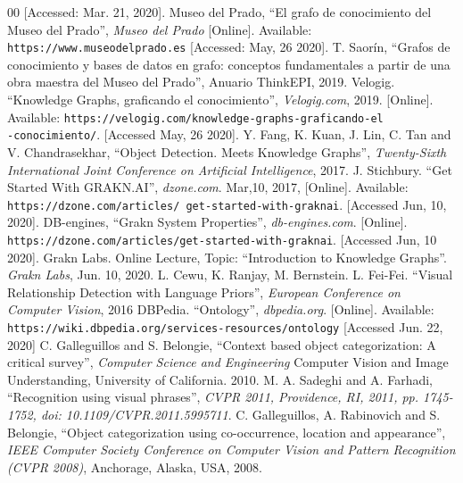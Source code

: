 \begin{thebibliography}{00}
  [Accessed: Mar. 21, 2020].
  Museo del Prado, ``El grafo de conocimiento del Museo del Prado'', 
  \textit{Museo del Prado} [Online]. Available: 
  \texttt{https://www.museodelprado.es} [Accessed: May, 26 2020].
  T. Saorín, ``Grafos de conocimiento y bases de datos en grafo:
  conceptos fundamentales a partir de una obra maestra del Museo del Prado'',
  Anuario ThinkEPI, 2019.
  Velogig. ``Knowledge Graphs, graficando el conocimiento'', 
  \textit{Velogig.com}, 2019. [Online]. Available: 
  \texttt{https://velogig.com/knowledge-graphs-graficando-el\\-conocimiento/}.
  [Accessed May, 26 2020].
  Y. Fang, K. Kuan, J. Lin, C. Tan and V. Chandrasekhar,
  ``Object Detection. Meets Knowledge Graphs'', 
  \textit{Twenty-Sixth International Joint Conference on Artificial 
  Intelligence}, 2017.
  J. Stichbury. ``Get Started With GRAKN.AI'', \textit{dzone.com}. Mar,10, 2017,
  [Online]. Available: \texttt{https://dzone.com/articles/
  get-started-with-graknai}. [Accessed Jun, 10, 2020].  
  DB-engines, ``Grakn System Properties'', \textit{db-engines.com}.
  [Online]. \texttt{https://dzone.com/articles/get-started-with-graknai}.
  [Accessed Jun, 10 2020].
  Grakn Labs. Online Lecture, Topic: ``Introduction to Knowledge Graphs''.
  \textit{Grakn Labs}, Jun. 10, 2020.
  L. Cewu, K. Ranjay, M. Bernstein. L. Fei-Fei.
  ``Visual Relationship Detection with Language Priors'',
  \textit{European Conference on Computer Vision}, 2016
  DBPedia. ``Ontology'', \textit{dbpedia.org}. [Online]. Available:
  \texttt{https://wiki.dbpedia.org/services-resources/ontology}  
  [Accessed Jun.  22, 2020]  
  C. Galleguillos and S. Belongie, ``Context based object categorization: 
  A critical survey'', \textit{Computer Science and Engineering} 
   Computer Vision and Image Understanding, University of California. 2010.
  M. A. Sadeghi and A. Farhadi, ``Recognition using visual phrases'', 
  \textit{CVPR 2011, Providence, RI, 2011, pp. 1745-1752, 
  doi: 10.1109/CVPR.2011.5995711}.
   C. Galleguillos, A. Rabinovich and S. Belongie, ``Object  
   categorization  using  co-occurrence, location and appearance'',
   \textit{ IEEE Computer Society Conference on Computer Vision and Pattern
   Recognition (CVPR 2008)}, Anchorage, Alaska, USA, 2008.
\end{thebibliography}


